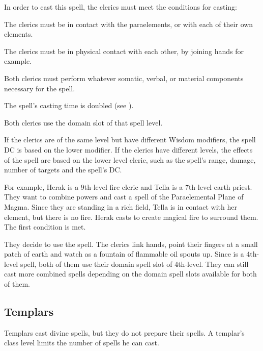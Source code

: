In order to cast this spell, the clerics must meet the conditions for casting:
\begin{itemize*}
\item The clerics must be in contact with the paraelements, or with each of their own elements.
\item The clerics must be in physical contact with each other, by joining hands for example.
\item Both clerics must perform whatever somatic, verbal, or material components necessary for the spell.
\item The spell's casting time is doubled (see ).
\item Both clerics use the domain slot of that spell level.
\end{itemize*}


If the clerics are of the same level but have different Wisdom modifiers, the spell DC is based on the lower modifier. If the clerics have different levels, the effects of the spell are based on the lower level cleric, such as the spell's range, damage, number of targets and the spell's DC.

For example, Herak is a 9th-level fire cleric and Tella is a 7th-level earth priest. They want to combine powers and cast a spell of the Paraelemental Plane of Magma. Since they are standing in a rich field, Tella is in contact with her element, but there is no fire. Herak casts  to create magical fire to surround them. The first condition is met.

They decide to use the  spell. The clerics link hands, point their fingers at a small patch of earth and watch as a fountain of flammable oil spouts up. Since  is a 4th-level spell, both of them use their domain spell slot of 4th-level. They can still cast more combined spells depending on the domain spell slots available for both of them.

\subsection{Templars}
Templars cast divine spells, but they do not prepare their spells. A templar's class level limits the number of spells he can cast. %

